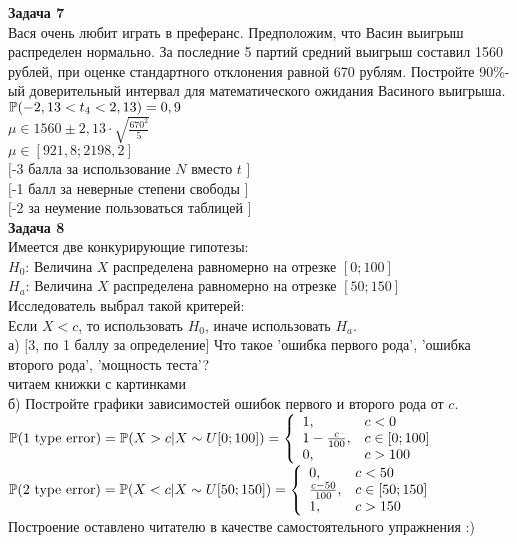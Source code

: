 \documentclass[pdftex,12pt,a4paper]{article}
\begin{document}
{\bf Задача 7} \\
Вася очень любит играть в преферанс. Предположим, что Васин
выигрыш распределен нормально. За последние 5 партий средний
выигрыш составил 1560 рублей, при оценке стандартного отклонения
равной 670 рублям. Постройте 90\%-ый доверительный интервал для
математического ожидания Васиного выигрыша. \\
$\P(-2,13<t_{4}<2,13)=0,9$ \\
$\mu \in 1560 \pm 2,13\cdot \sqrt{\frac{670^{2}}{5}}$ \\
$\mu \in [921,8;2198,2]$ \\
$[$-3 балла за использование $N$ вместо $t$ $]$ \\
$[$-1 балл за неверные степени свободы $]$ \\
$[$-2 за неумение пользоваться таблицей $]$ \\

{\bf Задача 8} \\
Имеется две конкурирующие гипотезы: \\
$H_{0}$: Величина $X$ распределена равномерно на отрезке $[0;100]$ \\
$H_{a}$: Величина $X$ распределена равномерно на отрезке $[50;150]$ \\
Исследователь выбрал такой критерей: \\
Если $X<c$, то использовать $H_{0}$, иначе использовать $H_{a}$. \\
а) $[$3, по 1 баллу за определение$]$ Что такое 'ошибка первого
рода', 'ошибка второго рода',
'мощность теста'? \\
читаем книжки с картинками \\
б) Постройте графики зависимостей ошибок первого и второго рода от
$c$. \\
$\P(\text{1 type error})=\P(X>c|X\sim U[0;100])= \left\{
\begin{array}{ll}
  1, & c<0 \\
  1-\frac{c}{100}, & c \in [0;100] \\
  0, & c>100 \\
\end{array}
\right.$ \\
$\P(\text{2 type error})=\P(X<c|X\sim U[50;150])= \left\{
\begin{array}{ll}
  0, & c<50 \\
  \frac{c-50}{100}, & c \in [50;150] \\
  1, & c>150 \\
\end{array}
\right.$ \\
Построение оставлено читателю в качестве самостоятельного
упражнения :) \\
\end{document}
